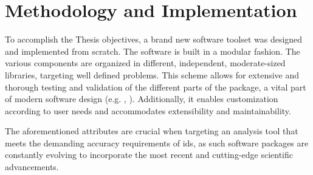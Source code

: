\iffalse
This thesis is a study of orbit determination for \gls{leo} satellites, using the \gls{doris}
The aim is a robust methodology, providing
quality satellite state estimates, one though that can be efficient enough to be implemented for near-real time
applications. Hence, algorithmic design and implementation, as well as efficiency and resource awareness are all
topics to be considered. This thesis took place under a frame of an ambitious, nearly over optimistic goal, for
Dionysos Satellite Observatory to develop an orbit determination tool of its own; with this thesis, the groundwork
is more than laid. At international level, only a handful of such high-quality software tools exist, developed and
used by high caliber renowned institutions, with critical impact in the field of geodetic studies.
Guidelines set by the \gls{ids} act as the de-facto standard for orbit determination
via \gls{doris}. In this thesis we try to comply with this set of recommendations as close as possible, deviating when
needed to check and validate alternate or novel processing approaches.
\fi

\section{Methodology and Implementation}\label{ssec:methodology}

To accomplish the Thesis objectives, a brand new software toolset was designed and 
implemented from scratch. The software is built in a modular fashion. The various components
are organized in different, independent, moderate-sized libraries, targeting well defined
problems. This scheme allows for extensive and thorough testing and validation  of the different 
parts of the package, a vital part of modern software design (e.g. \cite{Oberkampf2010}, \cite{Meyer2008}).
Additionally, it enables customization according to user needs and accommodates  
extensibility and maintainability.
\iffalse
The latter attributes are of major importance when
aiming at an analysis tool reaching \gls{ids} accuracy demands, since such software packages 
are in an ever-lasting cycle of adopting the latest, most up-to-date scientific advancements.
\fi
The aforementioned attributes are crucial when targeting an analysis tool that meets the
demanding accuracy requirements of \gls{ids}, as such software packages are constantly
evolving to incorporate the most recent and cutting-edge scientific advancements.


